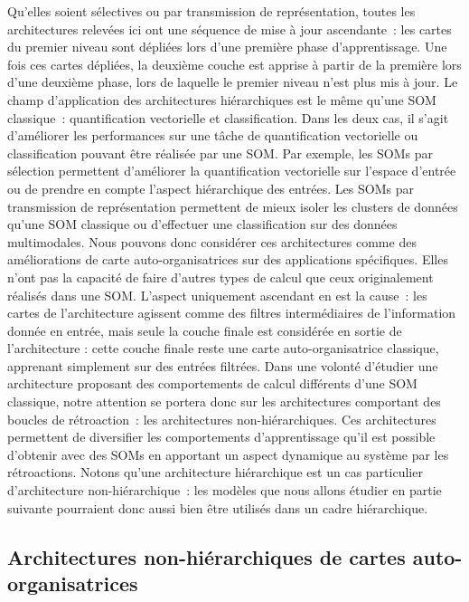 \documentclass[../main]{subfiles}
\begin{document}
Qu'elles soient sélectives ou par transmission de représentation, toutes les architectures relevées ici ont une séquence de mise à jour ascendante~: les cartes du premier niveau sont dépliées lors d'une première phase d'apprentissage. Une fois ces cartes dépliées, la deuxième couche est apprise à partir de la première lors d'une deuxième phase, lors de laquelle le premier niveau n'est plus mis à jour.
Le champ d'application des architectures hiérarchiques est le même qu'une SOM classique~: quantification vectorielle et classification.
Dans les deux cas, il s'agit d'améliorer les performances sur une tâche de quantification vectorielle ou classification pouvant être réalisée par une SOM. 
Par exemple, les SOMs par sélection permettent d'améliorer la quantification vectorielle sur l'espace d'entrée ou de prendre en compte l'aspect hiérarchique des entrées. Les SOMs par transmission de représentation permettent de mieux isoler les clusters de données qu'une SOM classique ou d'effectuer une classification sur des données multimodales.
Nous pouvons donc considérer ces architectures comme des améliorations de carte auto-organisatrices sur des applications spécifiques.
Elles n'ont pas la capacité de faire d'autres types de calcul que ceux originalement réalisés dans une SOM.
L'aspect uniquement ascendant en est la cause~: les cartes de l'architecture agissent comme des filtres intermédiaires de l'information donnée en entrée, mais seule la couche finale est considérée en sortie de l'architecture : cette couche finale reste une carte auto-organisatrice classique, apprenant simplement sur des entrées filtrées.
Dans une volonté d'étudier une architecture proposant des comportements de calcul différents d'une SOM classique, notre attention se portera donc sur les architectures comportant des boucles de rétroaction~: les architectures non-hiérarchiques.
Ces architectures permettent de diversifier les comportements d'apprentissage qu'il est possible d'obtenir avec des SOMs en apportant un aspect dynamique au système par les rétroactions. 
Notons qu'une architecture hiérarchique est un cas particulier d'architecture non-hiérarchique~: les modèles que nous allons étudier en partie suivante pourraient donc aussi bien être utilisés dans un cadre hiérarchique.


\subsection{Architectures non-hiérarchiques de cartes auto-organisatrices}
\end{document}

